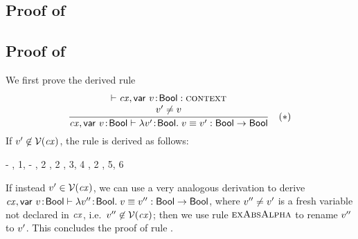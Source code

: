 \subsection*{Proof of }

\begin{derivation}
\end{derivation}



\subsection*{Proof of }

We first prove the derived rule
\[
\frac{\begin{array}{c}\vdash\mathit{cx},\mathsf{var}\ v\!:\!\mathsf{Bool}:\textsc{context}\\v'\neq v\end{array}}{\mathit{cx},\mathsf{var}\ v\!:\!\mathsf{Bool}\vdash\lambda v'\!:\!\mathsf{Bool}.\;v\equiv v':\mathsf{Bool}\to\mathsf{Bool}}\quad\mbox{($\ast$)}
\]
If $v'\not\in\mathcal{V}(\mathit{cx})$, the rule is derived as follows:
\begin{derivation}
\step{\cxwf{\snoc{\cx}{\vdec{\var}{\bool}}}}
     {\hyp}
     {\Rcxvdecbool, 1, \hyp}
     {\Revar, 2}
     {\Revar, 2}
     {\Reeq, 3, 4}
\step{\isty{\snoc{\cx}{\vdec{\var}{\bool}}}{\bool}}
     {, 2}
     {\Reabs, 5, 6}
\end{derivation}
If instead $v'\in\mathcal{V}(\mathit{cx})$, we can use a very analogous derivation to
derive
$\mathit{cx},\mathsf{var}\ v\!:\!\mathsf{Bool}\vdash\lambda v''\!:\!\mathsf{Bool}.\;v\equiv v'':\mathsf{Bool}\to\mathsf{Bool}$,
where $v''\neq v'$ is a fresh variable not declared in $\mathit{cx}$, i.e.\
$v''\not\in\mathcal{V}(\mathit{cx})$; then we use rule $\textsc{exAbsAlpha}$ to rename $v''$
to $v'$. This concludes the proof of rule \RtmpI.

